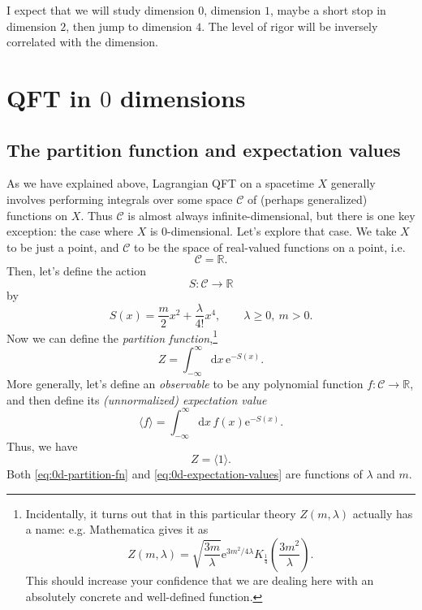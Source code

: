 \documentclass[12pt,letterpaper,reqno]{article}
\numberwithin{equation}{section}
\newcommand{\cC}{\ensuremath{\mathcal C}}
\newcommand{\R}{\ensuremath{\mathbb R}}
\newcommand{\e}{{\mathrm e}}
\newcommand{\de}{\mathrm{d}}
\newcommand{\IP}[1]{\langle#1\rangle}
\newcommand{\ti}[1]{\textit{#1}}
\begin{document}
I expect that we will study dimension $0$, dimension $1$, maybe a short stop in dimension $2$,
then jump to dimension $4$. The level of rigor will be inversely correlated with the dimension.





\section{QFT in \texorpdfstring{$0$}{0} dimensions}

\subsection{The partition function and expectation values}

As we have explained above, Lagrangian QFT on a spacetime $X$ generally involves performing integrals
over some space $\cC$ of (perhaps generalized) functions on $X$. Thus $\cC$ is almost 
always infinite-dimensional,
but there is one key exception: the case where $X$ is $0$-dimensional. Let's explore that case.
We take $X$ to be just a point,
and $\cC$ to be the space of real-valued functions on a point, i.e.
\begin{equation}
  \cC = \R.
\end{equation}
Then, let's define the action
\begin{equation}
  S: \cC \to \R
\end{equation}
by
\begin{equation} \label{eq:0d-action-quartic}
  S(x) = \frac{m}{2} x^2 + \frac{\lambda}{4!} x^4, \qquad \lambda \ge 0, \ m > 0.
\end{equation}
Now we can define the \ti{partition function},\footnote{Incidentally, it turns out that in this particular theory $Z(m,\lambda)$ 
actually has a name: e.g. Mathematica gives it as
\begin{equation}
  Z(m,\lambda) = \sqrt{\frac{3m}{\lambda}} \e^{3 m^2 / 4 \lambda} K_{\frac14} \left(\frac{3m^2}{\lambda}\right).
\end{equation}
This should increase your confidence that we are dealing here with
an absolutely concrete and well-defined function.}
\begin{equation} \label{eq:0d-partition-fn}
  Z = \int_{-\infty}^\infty \de x \, \e^{-S(x)}.
\end{equation}
More generally, let's define an \ti{observable} to be any polynomial function $f: \cC \to \R$, and
then define its \ti{(unnormalized) expectation value}
\begin{equation} \label{eq:0d-expectation-values}
  \IP{f} = \int_{-\infty}^\infty \de x \, f(x) \e^{-S(x)}.
\end{equation}
Thus, we have
\begin{equation}
  Z = \IP{1}.
\end{equation}
Both \eqref{eq:0d-partition-fn} and \eqref{eq:0d-expectation-values} are functions of
$\lambda$ and $m$.
\end{document}
